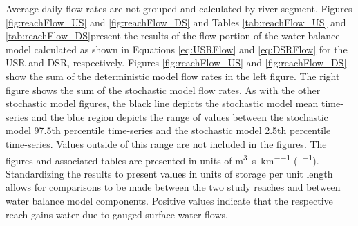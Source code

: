 Average daily flow rates are not grouped and calculated by river segment.  Figures \ref{fig:reachFlow_US} and \ref{fig:reachFlow_DS} and Tables \ref{tab:reachFlow_US} and \ref{tab:reachFlow_DS}present the results of the flow portion of the water balance model calculated as shown in Equations \ref{eq:USRFlow} and \ref{eq:DSRFlow} for the USR and DSR, respectively.  Figures \ref{fig:reachFlow_US} and \ref{fig:reachFlow_DS} show the sum of the deterministic model flow rates in the left figure.  The right figure shows the sum of the stochastic model flow rates.  As with the other stochastic model figures, the black line depicts the stochastic model mean time-series and the blue region depicts the range of values between the stochastic model 97.5th percentile time-series and the stochastic model 2.5th percentile time-series.  Values outside of this range are not included in the figures.  The figures and associated tables are presented in units of \si{\cubic\meter\per\second\per\kilo\meter} (\si{\cfs\per\mile}).  Standardizing the results to present values in units of storage per unit length allows for comparisons to be made between the two study reaches and between water balance model components.  Positive values indicate that the respective reach gains water due to gauged surface water flows.

